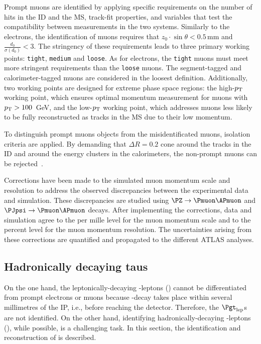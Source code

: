 Prompt muons are identified by applying specific requirements on the number of hits in the ID 
and the MS, track-fit properties, and variables that test the compatibility between measurements 
in the two systems. 
Similarly to the electrons, 
the identification of muons requires that $z_{0} \cdot \sin\theta < 0.5\,$mm and 
$\frac{d_{0}}{\sigma(d_{0})} < 3$. 
The stringency of these requirements leads to three primary working points:
\texttt{tight}, \texttt{medium} and \texttt{loose}. As for electrons, the \texttt{tight} muons must meet 
more stringent requirements than the \texttt{loose} muons. 
The segment-tagged and calorimeter-tagged muons are considered in the loosest definition.
Additionally, two working points are designed for extreme phase space regions: the high-$p_{\text{T}}$ 
working point, which ensures optimal momentum measurement for muons with $p_{\text{T}} > 100$~GeV, 
and the low-$p_{\text{T}}$ working point, which addresses muons less likely to be fully reconstructed as 
tracks in the MS due to their low momentum.

To distinguish prompt muons objects from the misidentificated muons, isolation criteria are applied.
By demanding that $\Delta R=0.2$ cone around the tracks in the ID and around the energy clusters  
in the calorimeters, the non-prompt muons can be rejected~\cite{ATLAS:2020auj}. 

Corrections have been made to the simulated muon momentum scale and resolution to address
the observed discrepancies between the experimental data and simulation.
These discrepancies are studied using $\PZ \rightarrow \Pmuon \APmuon$ 
and $\PJpsi \rightarrow \Pmuon \APmuon$ decays. After implementing the corrections, data and %
simulation agree to the per mille level for the muon momentum scale and to the percent level for the 
muon momentum resolution. The uncertainties arising from these corrections are quantified and propagated to 
the different ATLAS analyses.


\subsection{Hadronically decaying taus}
\label{sec:Chap3:Reco:Tau}
On the one hand, the leptonically-decaying \Ptau-leptons (\taulep) cannot be differentiated from prompt
electrons or muons because \Ptau-decay takes place within several millimetres of the IP, 
i.e., before reaching the detector. Therefore, the $\taulep$s are not identified. 
On the other hand, identifying hadronically-decaying \Ptau-leptons (\tauhad), while possible, is a challenging task. In this section, the identification and reconstruction of \tauhad is described.

